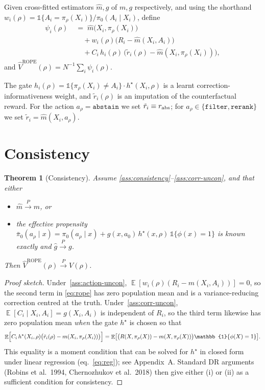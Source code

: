 \documentclass[11pt]{article}
\newtheorem{theorem}{Theorem}
\DeclareMathOperator{\E}{\mathbb{E}}
\newcommand{\ind}{\mathbb{1}}
\begin{document}
Given cross-fitted estimators $\widehat m, \widehat g$ of
$m, g$ respectively, and using the shorthand
$w_i(\rho) = \ind\{A_i = \pi_\rho(X_i)\}/\pi_0(A_i \mid X_i)$, define
\begin{align}
\psi_i(\rho) \;&=\; \widehat m\bigl(X_i, \pi_\rho(X_i)\bigr) \nonumber \\
  &\quad + w_i(\rho)\bigl(R_i - \widehat m(X_i, A_i)\bigr) \nonumber \\
  &\quad + C_i\, h_i(\rho)\,\bigl(\tilde r_i(\rho) - \widehat m(X_i, \pi_\rho(X_i))\bigr),
\label{eq:rope}
\end{align}
and $\widehat V^{\text{ROPE}}(\rho) = N^{-1}\sum_i \psi_i(\rho)$.

The gate $h_i(\rho) = \ind\{\pi_\rho(X_i)\ne A_i\}\cdot h^\star(X_i, \rho)$
is a learnt correction-informativeness weight, and $\tilde r_i(\rho)$
is an imputation of the counterfactual reward.  For the action
$a_\rho = \texttt{abstain}$ we set $\tilde r_i \equiv r_{\rm abs}$;
for $a_\rho \in \{\texttt{filter}, \texttt{rerank}\}$ we set
$\tilde r_i = \widehat m(X_i, a_\rho)$.

\section{Consistency}

\begin{theorem}[Consistency]\label{thm:consistency}
Assume \ref{ass:consistency}--\ref{ass:corr-uncon}, and that either
\begin{itemize}
\item[(i)] $\widehat m \xrightarrow{P} m$, or
\item[(ii)] the effective propensity
  $\bar\pi_0(a_\rho \mid x) = \pi_0(a_\rho \mid x) +
  g(x, a_0)\,h^\star(x, \rho)\,\ind\{\phi(x) = 1\}$ is known exactly
  and $\widehat g \xrightarrow{P} g$.
\end{itemize}
Then $\widehat V^{\text{ROPE}}(\rho) \xrightarrow{P} V(\rho)$.
\end{theorem}

\begin{proof}[Proof sketch]
Under~\ref{ass:action-uncon},
$\E[w_i(\rho)(R_i - m(X_i, A_i))] = 0$, so the second term in
\eqref{eq:rope} has zero population mean and is a variance-reducing
correction centred at the truth.  Under~\ref{ass:corr-uncon},
$\E[C_i \mid X_i, A_i] = g(X_i, A_i)$ is independent of $R_i$, so
the third term likewise has zero population mean \emph{when} the gate
$h^\star$ is chosen so that
\[
\E\Bigl[C_i\,h^\star(X_i, \rho)\bigl(\tilde r_i(\rho) - m(X_i, \pi_\rho(X_i))\bigr)\Bigr]
= \E\bigl[\bigl(R(X, \pi_\rho(X)) - m(X, \pi_\rho(X))\bigr) \ind\{\phi(X)=1\}\bigr].
\]
This equality is a moment condition that can be solved for $h^\star$ in
closed form under linear regression (eq.~\ref{eq:reg}); see
Appendix~A.  Standard DR arguments (Robins et al.\ 1994,
Chernozhukov et al.\ 2018) then give either (i) or (ii) as a
sufficient condition for consistency.
\end{proof}
\end{document}
